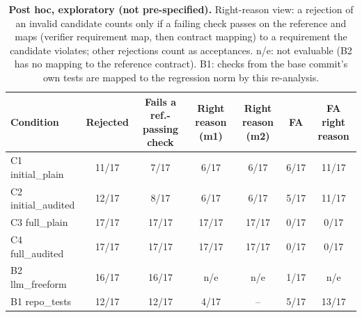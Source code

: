 \begin{table}[t]\centering\footnotesize
\caption{\textbf{Post hoc, exploratory (not pre-specified).} Right-reason view: a rejection of an invalid candidate counts only if a failing check passes on the reference and maps (verifier requirement map, then contract mapping) to a requirement the candidate violates; other rejections count as acceptances. n/e: not evaluable (B2 has no mapping to the reference contract). B1: checks from the base commit's own tests are mapped to the regression norm by this re-analysis.}\label{tab:expl-right-reason}
\begin{tabular}{lcccccc}\toprule Condition & Rejected & Fails a ref.-passing check & Right reason (m1) & Right reason (m2) & FA & FA right reason \\\midrule
C1 initial\_plain & 11/17 & 7/17 & 6/17 & 6/17 & 6/17 & 11/17 \\
C2 initial\_audited & 12/17 & 8/17 & 6/17 & 6/17 & 5/17 & 11/17 \\
C3 full\_plain & 17/17 & 17/17 & 17/17 & 17/17 & 0/17 & 0/17 \\
C4 full\_audited & 17/17 & 17/17 & 17/17 & 17/17 & 0/17 & 0/17 \\
B2 llm\_freeform & 16/17 & 16/17 & n/e & n/e & 1/17 & n/e \\
B1 repo\_tests & 12/17 & 12/17 & 4/17 & -- & 5/17 & 13/17 \\
\bottomrule\end{tabular}\end{table}
